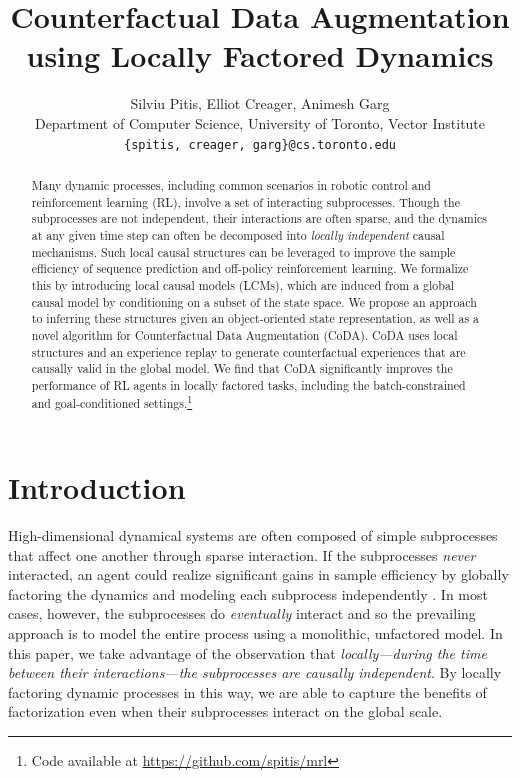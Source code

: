 \documentclass{article}
\title{Counterfactual Data Augmentation\\ using Locally Factored Dynamics}
\author{%
Silviu Pitis, Elliot Creager, Animesh Garg\\
Department of Computer Science, University of Toronto, Vector Institute\\
\texttt{\{spitis, creager, garg\}@cs.toronto.edu} 
}
\begin{document}
\maketitle

\begin{abstract}
Many dynamic processes, including common scenarios in robotic control and reinforcement learning (RL), involve a set of interacting subprocesses. Though the subprocesses are not independent, their interactions are often sparse, and the dynamics at any given time step can often be decomposed into \textit{locally independent} causal mechanisms. Such local causal structures can be leveraged to improve the sample efficiency of sequence prediction and off-policy reinforcement learning. We formalize this by introducing local causal models (LCMs), which are induced from a global causal model by conditioning on a subset of the state space. We propose an approach to inferring these structures given an object-oriented state representation, as well as a novel algorithm for Counterfactual Data Augmentation (CoDA). CoDA uses local structures and an experience replay to generate counterfactual experiences that are causally valid in the global model. We find that CoDA significantly improves the performance of RL agents in locally factored tasks, including the batch-constrained and goal-conditioned settings.\footnote{Code available at \url{https://github.com/spitis/mrl}}
\end{abstract}

\section{Introduction}

High-dimensional dynamical systems are often composed of simple subprocesses that affect one another through sparse interaction. 
If the subprocesses \emph{never} interacted, an agent could realize significant gains in sample efficiency by globally factoring the dynamics and modeling each subprocess independently \cite{guestrin2003efficient,hallak2015off}.
In most cases, however, the subprocesses do \emph{eventually} interact and so the prevailing approach is to model the entire process using a monolithic, unfactored model. 
In this paper, we take advantage of the observation that \textit{locally---during the time between their interactions---the subprocesses are causally independent}. By locally factoring dynamic processes in this way, we are able to capture the benefits of factorization even when their subprocesses interact on the global scale. 
\end{document}
